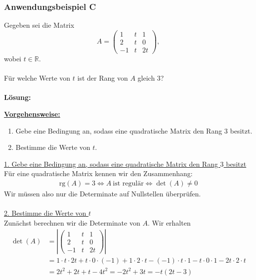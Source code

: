 \subsubsection*{Anwendungsbeispiel C}
Gegeben sei die Matrix
\begin{equation*}
A = 
\begin{pmatrix}
1 & t & 1 \\
2 & t & 0 \\
-1 & t & 2t
\end{pmatrix},
\end{equation*}
wobei $t \in \mathbb{R}$.
\\
\\
Für welche Werte von $t$ ist der Rang von $A$ gleich $3$?
\\
\\
\textbf{Lösung:}
\begin{mdframed}
\renewcommand{\labelenumi}{\theenumi.}
\underline{\textbf{Vorgehensweise:}}
\begin{enumerate}
\item Gebe eine Bedingung an, sodass eine quadratische Matrix den Rang $3$ besitzt.
\item Bestimme die Werte von $t$.
\end{enumerate}
\end{mdframed}
\underline{1. Gebe eine Bedingung an, sodass eine quadratische Matrix den Rang $3$ besitzt}\\
Für eine quadratische Matrix kennen wir den Zusammenhang:
\begin{align*}
\text{rg}(A) = 3 
\Leftrightarrow
A \ \text{ist regulär}
\Leftrightarrow
\det(A) \neq 0
\end{align*}
Wir müssen also nur die Determinate auf Nullstellen überprüfen.\\
\\
\underline{2. Bestimme die Werte von $t$}\\
Zunächst berechnen wir die Determinate von $A$.
Wir erhalten 
\begin{equation*}
\begin{split}
\det(A)
&= 
\left| 
\begin{pmatrix}
1 & t & 1 \\
2 & t & 0 \\
-1 & t & 2t
\end{pmatrix}
\right|\\
&=
1 \cdot t \cdot 2t +t \cdot 0 \cdot (-1) + 1 \cdot 2 \cdot t 
- (-1) \cdot t \cdot 1 - t \cdot 0  \cdot 1 - 2t \cdot 2 \cdot t\\
&=
2 t^2 + 2t + t - 4 t^2 
= -2 t^2 +3 t = -t ( 2 t - 3)
\end{split}
\end{equation*}
